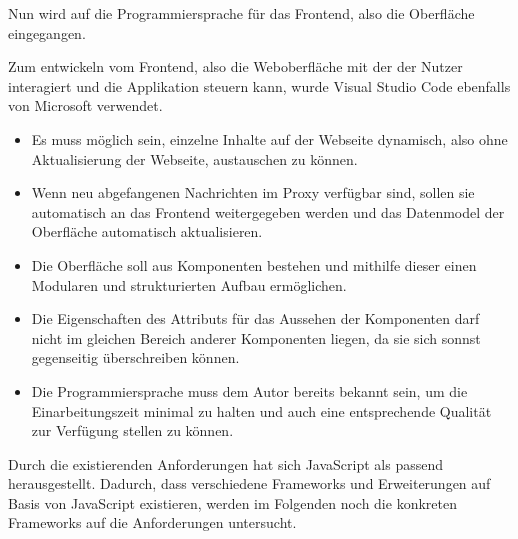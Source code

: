     Nun wird auf die Programmiersprache für das Frontend, also die Oberfläche eingegangen.
    
    Zum entwickeln vom Frontend, also die Weboberfläche mit der der Nutzer interagiert und die Applikation steuern kann, wurde Visual Studio Code \cite{microsoft_2016} ebenfalls von Microsoft verwendet.
    
    \begin{itemize}
        \item Es muss möglich sein, einzelne Inhalte auf der Webseite dynamisch, also ohne Aktualisierung der Webseite, austauschen zu können.
        \item Wenn neu abgefangenen Nachrichten im Proxy verfügbar sind, sollen sie automatisch an das Frontend weitergegeben werden und das Datenmodel der Oberfläche automatisch aktualisieren.
        \item Die Oberfläche soll aus Komponenten bestehen und mithilfe dieser einen Modularen und strukturierten Aufbau ermöglichen.
        \item Die Eigenschaften des Attributs für das Aussehen der Komponenten darf nicht im gleichen Bereich anderer Komponenten liegen, da sie sich sonnst gegenseitig überschreiben können.
        \item Die Programmiersprache muss dem Autor bereits bekannt sein, um die Einarbeitungszeit minimal zu halten und auch eine entsprechende Qualität zur Verfügung stellen zu können.
    \end{itemize}
    
    Durch die existierenden Anforderungen hat sich JavaScript als passend herausgestellt. Dadurch, dass verschiedene Frameworks und Erweiterungen auf Basis von JavaScript existieren, werden im Folgenden noch die konkreten Frameworks auf die Anforderungen untersucht.
    

